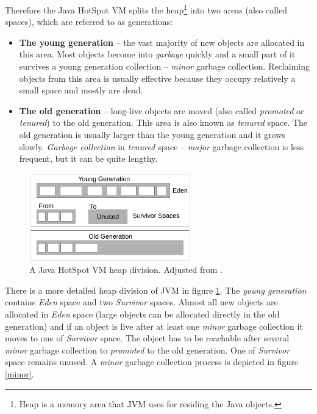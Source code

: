 \documentclass[
  digital, %
  oneside,
  notable, %
  nolof,     %
  nolot     %
]{fithesis3}
\begin{document}
Therefore the Java HotSpot VM splits the heap\footnote{Heap is a memory area that JVM uses for residing the Java objects.} into two areas (also called spaces), which are referred to as generations: \cite{hunt}
\begin{itemize}
	\item \textbf{The young generation} -- the vast majority of new objects are allocated in this area. Most objects become into \textit{garbage} quickly and a small part of it survives a young generation collection -- \textit{minor} garbage collection. Reclaiming objects from this area is usually effective because they occupy relatively a small space and mostly are dead. 
	\item \textbf{The old generation} -- long-live objects are moved (also called \textit{promoted} or \textit{tenured}) to the old generation. This area is also known as \textit{tenured} space. The old generation is usually larger than the young generation and it grows slowly. \textit{Garbage collection} in \textit{tenured} space -- \textit{major} garbage collection is less frequent, but it can be quite lengthy.
\end{itemize}

\begin{figure}[h]
	\centering
	\includegraphics[width=7cm]{fig/heap.pdf}
	\caption{A Java HotSpot VM heap division. Adjusted from \cite{hunt}.}
	\label{heap}
\end{figure}

There is a more detailed heap division of JVM in figure \ref{heap}. The \textit{young generation} contains \textit{Eden} space and two \textit{Survivor} spaces. Almost all new objects are allocated in \textit{Eden} space (large objects can be allocated directly in the old generation) and if an object is live after at least one \textit{minor} garbage collection it moves to one of \textit{Survivor} space. The object has to be reachable after several \textit{minor} garbage collection to \textit{promoted} to the old generation. One of \textit{Survivor} space remains unused. A \textit{minor} garbage collection process is depicted in figure \ref{minor}.
\end{document}
